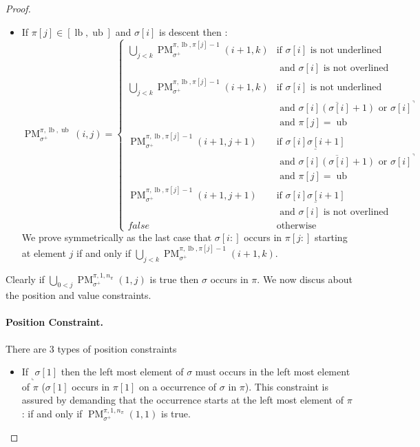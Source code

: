 \documentclass[a4paper]{llncs}
\newcommand{\ptext}{\pi}
\newcommand{\pmotif}{\sigma}
\newcommand{\pbmotif}{\pmotif^+}
\DeclareMathOperator{\PMa}{PM}
\newcommand{\PM}[6]{\PMa_{{#1}}^{{#2},{#3},{#4}}({#5},{#6})}
\DeclareMathOperator{\lb}{lb}
\DeclareMathOperator{\ub}{ub}
\begin{document}
\begin{proof}
\begin{itemize}
	\item If $\ptext[j] \in [\lb,\ub]$ and $\pmotif[i]$ is descent then :
	$$
	\PM{\pbmotif}{\ptext}{\lb}{\ub}{i}{j}=
	\begin{cases}
			\bigcup_{j<k} \PM{\pbmotif}{\ptext}{\lb}{\ptext[j]-1}{i+1}{k}
				& \text{if $\pmotif[i]$ is not underlined } \\
				& \text{ and $\pmotif[i]$ is not overlined} \\ 
			\bigcup_{j<k} \PM{\pbmotif}{\ptext}{\lb}{\ptext[j]-1}{i+1}{k}
				& \text{if $\pmotif[i]$ is not underlined } \\
				& \text{ and $\overline{\pmotif[i](\pmotif[i]+1)}$ or ${\pmotif[i]}^\urcorner$}\\ 	
				& \text{ and $\ptext[j]=\ub$} \\
			\PM{\pbmotif}{\ptext}{\lb}{\ptext[j]-1}{i+1}{j+1}	
				& \text{if $\underline{\pmotif[i]\pmotif[i+1]}$ } \\
				& \text{ and $\overline{\pmotif[i](\pmotif[i]+1)}$ or ${\pmotif[i]}^\urcorner$}\\ 	
				& \text{ and $\ptext[j]=\ub$} \\					
			\PM{\pbmotif}{\ptext}{\lb}{\ptext[j]-1}{i+1}{j+1}	
				& \text{if $\underline{\pmotif[i]\pmotif[i+1]}$ } \\
				& \text{ and $\pmotif[i]$ is not overlined} \\	
			false & \text{otherwise}		
	\end{cases}
	$$	
	We prove symmetrically as the last case that 
	$\pmotif[i:]$ occurs in $\ptext[j:]$ starting at element $j$ if and only if $\bigcup_{j<k} \PM{\pbmotif}{\ptext}{\lb}{\ptext[j]-1}{i+1}{k}$. 

\end{itemize}

Clearly if $\bigcup_{0<j} \PM{\pbmotif}{\ptext}{1}{n_\ptext}{1}{j}$ is true then $\sigma$ occurs in $\pi$. We now discus about the position and value constraints.
\paragraph{Position Constraint.} There are 3 types of position constraints 
\begin{itemize}
	\item If $_\llcorner{\sigma[1]}$ then the left most element of $\sigma$  must occurs in the left most element of $\pi$ ($\pmotif[1]$ occurs in $\ptext[1]$ on a occurrence of $\pmotif$ in $\ptext$). This constraint is assured by demanding that the occurrence starts at the left most element of $\ptext$ : if and only if  $\PM{\pbmotif}{\ptext}{1}{n_\ptext}{1}{1}$ is true.
	

\end{itemize}
\end{proof}
\end{document}
